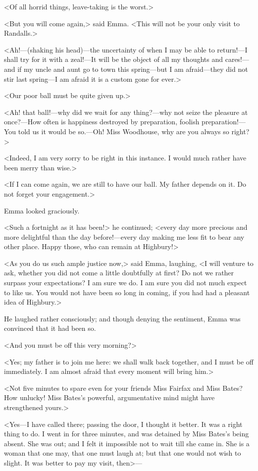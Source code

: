 <Of all horrid things, leave-taking is the worst.>

<But you will come again,> said Emma. <This will not be your only visit to Randalls.>

<Ah!—(shaking his head)—the uncertainty of when I may be able to return!—I shall try for it with a zeal!—It will be the object of all my thoughts and cares!—and if my uncle and aunt go to town this spring—but I am afraid—they did not stir last spring—I am afraid it is a custom gone for ever.>

<Our poor ball must be quite given up.>

<Ah! that ball!—why did we wait for any thing?—why not seize the pleasure at once?—How often is happiness destroyed by preparation, foolish preparation!—You told us it would be so.—Oh! Miss Woodhouse, why are you always so right?>

<Indeed, I am very sorry to be right in this instance. I would much rather have been merry than wise.>

<If I can come again, we are still to have our ball. My father depends on it. Do not forget your engagement.>

Emma looked graciously.

<Such a fortnight as it has been!> he continued; <every day more precious and more delightful than the day before!—every day making me less fit to bear any other place. Happy those, who can remain at Highbury!>

<As you do us such ample justice now,> said Emma, laughing, <I will venture to ask, whether you did not come a little doubtfully at first? Do not we rather surpass your expectations? I am sure we do. I am sure you did not much expect to like us. You would not have been so long in coming, if you had had a pleasant idea of Highbury.>

He laughed rather consciously; and though denying the sentiment, Emma was convinced that it had been so.

<And you must be off this very morning?>

<Yes; my father is to join me here: we shall walk back together, and I must be off immediately. I am almost afraid that every moment will bring him.>

<Not five minutes to spare even for your friends Miss Fairfax and Miss Bates? How unlucky! Miss Bates's powerful, argumentative mind might have strengthened yours.>

<Yes—I have called there; passing the door, I thought it better. It was a right thing to do. I went in for three minutes, and was detained by Miss Bates's being absent. She was out; and I felt it impossible not to wait till she came in. She is a woman that one may, that one must laugh at; but that one would not wish to slight. It was better to pay my visit, then>—

